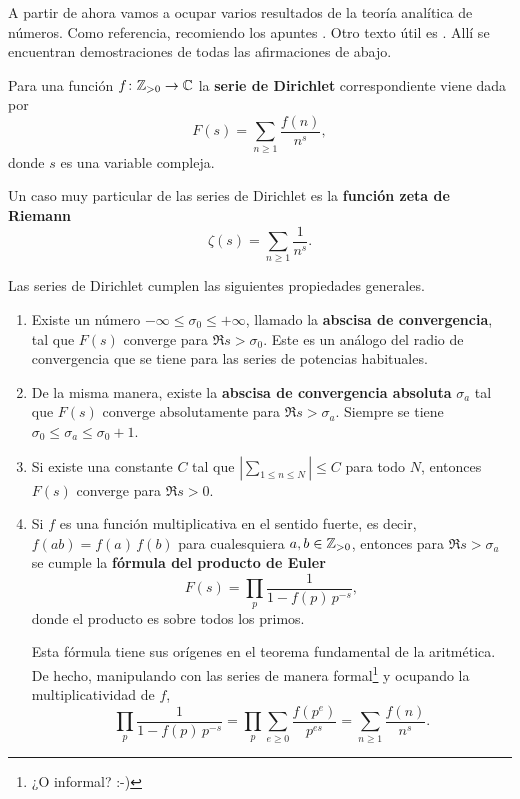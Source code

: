 A partir de ahora vamos a ocupar varios resultados de la teoría analítica de
números. Como referencia, recomiendo los apuntes \cite{Everiste-ANT}. Otro texto
útil es \cite{Hlawka-Taschner-Schoissengeier}. Allí se encuentran demostraciones
de todas las afirmaciones de abajo.

\begin{definicion}
  Para una función $f\colon \mathbb{Z}_{>0} \to \mathbb{C}$ la \textbf{serie de Dirichlet}
  correspondiente viene dada por
  $$F (s) = \sum_{n\ge 1} \frac{f(n)}{n^s},$$
  donde $s$ es una variable compleja.
\end{definicion}

Un caso muy particular de las series de Dirichlet es la
\textbf{función zeta de Riemann}
$$\zeta (s) = \sum_{n\ge 1} \frac{1}{n^s}.$$

Las series de Dirichlet cumplen las siguientes propiedades generales.

\begin{enumerate}
\item Existe un número $-\infty \le \sigma_0 \le +\infty$, llamado
  la \textbf{abscisa de convergencia}, tal que $F (s)$ converge para
  $\Re s > \sigma_0$. Este es un análogo del radio de convergencia que se tiene
  para las series de potencias habituales.

\item De la misma manera, existe la \textbf{abscisa de convergencia absoluta}
  $\sigma_a$ tal que $F (s)$ converge absolutamente para $\Re s > \sigma_a$.
  Siempre se tiene $\sigma_0 \le \sigma_a \le \sigma_0 + 1$.

\item Si existe una constante $C$ tal que
  $\left|\sum_{1 \le n\le N}\right| \le C$ para todo $N$, entonces $F (s)$
  converge para $\Re s > 0$.

\item Si $f$ es una función multiplicativa en el sentido fuerte, es decir,
  $f (ab) = f (a)\,f (b)$ para cualesquiera $a, b \in \mathbb{Z}_{> 0}$, entonces
  para $\Re s > \sigma_a$ se cumple la \textbf{fórmula del producto de Euler}
  $$F (s) = \prod_p \frac{1}{1 - f (p)\,p^{-s}},$$
  donde el producto es sobre todos los primos.

  Esta fórmula tiene sus orígenes en el teorema fundamental de la aritmética.
  De hecho, manipulando con las series de manera
  formal\footnote{¿O informal? :-)}  y ocupando la multiplicatividad de $f$,
  \[ \prod_p \frac{1}{1 - f (p)\,p^{-s}} =
     \prod_p \sum_{e \ge 0} \frac{f (p^e)}{p^{es}} =
     \sum_{n\ge 1} \frac{f (n)}{n^s}. \]
\end{enumerate}

